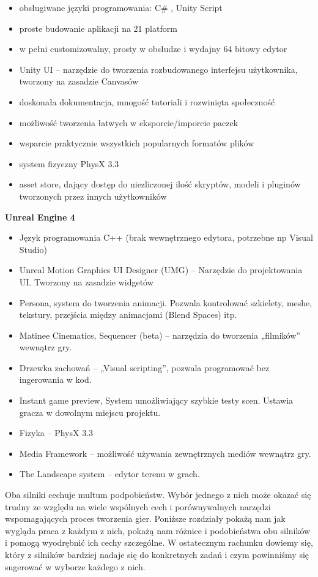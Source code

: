 \documentclass[12pt]{xmgr}
\begin{document}
	\begin{itemize}
	\item obsługiwane języki programowania: C\# , Unity Script
	\item proste budowanie aplikacji na 21 platform
	\item w pełni customizowalny, prosty w obsłudze  i wydajny 64 bitowy edytor
	\item Unity UI – narzędzie do tworzenia rozbudowanego interfejsu użytkownika, tworzony na zasadzie Canvasów
	\item doskonała dokumentacja, mnogość tutoriali  i rozwinięta społeczność
	\item możliwość tworzenia łatwych w eksporcie/imporcie paczek
	\item wsparcie praktycznie wszystkich popularnych formatów plików
	\item system fizyczny PhysX 3.3
	\item asset store, dający dostęp do niezliczonej ilość skryptów, modeli i pluginów tworzonych przez innych użytkowników
\end{itemize}

\textbf{Unreal Engine 4}

	\begin{itemize}
	\item Język programowania C++ (brak wewnętrznego edytora, potrzebne np Visual Studio)
	\item Unreal Motion Graphics UI Designer (UMG) – Narzędzie do projektowania UI. Tworzony 	na zasadzie widgetów
	\item Persona, system do tworzenia animacji. Pozwala kontrolować szkielety, meshe, tekstury, 	 przejścia między animacjami (Blend Spaces) itp.
	\item Matinee Cinematics, Sequencer (beta)  – narzędzia do tworzenia „filmików” wewnątrz gry.
	\item Drzewka zachowań – „Visual scripting”, pozwala programować bez ingerowania w kod.
	\item Instant game preview, System umożliwiający szybkie testy scen. Ustawia gracza w dowolnym miejscu projektu.
	\item Fizyka – PhysX 3.3
	\item Media Framework – możliwość używania zewnętrznych mediów wewnątrz gry.
	\item The Landscape system – edytor terenu w grach.
	\end{itemize}

Oba silniki cechuje multum podpobieństw. Wybór jednego z nich może okazać się trudny ze względu na wiele wspólnych cech i porównywalnych narzędzi wspomagających proces tworzenia gier. Poniższe rozdziały pokażą nam jak wygląda praca z każdym z nich, pokażą nam różnice i podobieństwa obu silników i pomogą wyodrębnić ich cechy szczególne. W ostatecznym rachunku dowiemy się, który z silników bardziej nadaje się do konkretnych zadań i czym powinniśmy się sugerować w wyborze każdego z nich.
\end{document}
